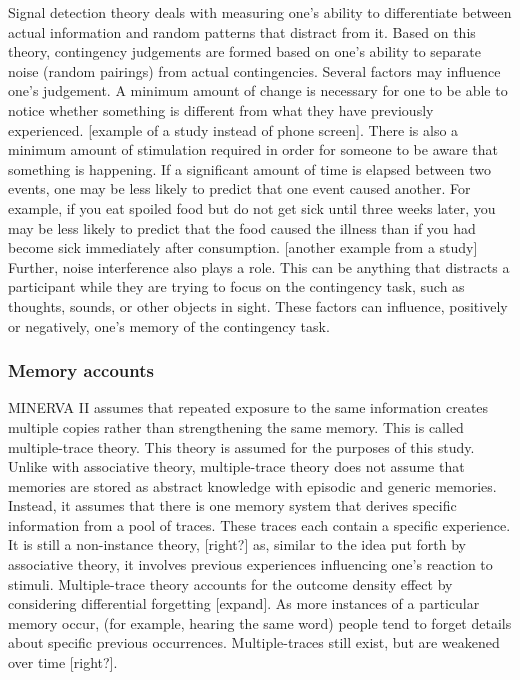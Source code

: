 \documentclass[
  english,
  man,floatsintext]{apa6}
\begin{document}
Signal detection theory deals with measuring one's ability to differentiate between actual information and random patterns that distract from it. Based on this theory, contingency judgements are formed based on one's ability to separate noise (random pairings) from actual contingencies. Several factors may influence one's judgement. A minimum amount of change is necessary for one to be able to notice whether something is different from what they have previously experienced. {[}example of a study instead of phone screen{]}. There is also a minimum amount of stimulation required in order for someone to be aware that something is happening. If a significant amount of time is elapsed between two events, one may be less likely to predict that one event caused another. For example, if you eat spoiled food but do not get sick until three weeks later, you may be less likely to predict that the food caused the illness than if you had become sick immediately after consumption. {[}another example from a study{]} Further, noise interference also plays a role. This can be anything that distracts a participant while they are trying to focus on the contingency task, such as thoughts, sounds, or other objects in sight. These factors can influence, positively or negatively, one's memory of the contingency task.

\hypertarget{memory-accounts}{%
\subsubsection{Memory accounts}\label{memory-accounts}}

MINERVA II assumes that repeated exposure to the same information creates multiple copies rather than strengthening the same memory. This is called multiple-trace theory. This theory is assumed for the purposes of this study. Unlike with associative theory, multiple-trace theory does not assume that memories are stored as abstract knowledge with episodic and generic memories. Instead, it assumes that there is one memory system that derives specific information from a pool of traces. These traces each contain a specific experience. It is still a non-instance theory, {[}right?{]} as, similar to the idea put forth by associative theory, it involves previous experiences influencing one's reaction to stimuli. Multiple-trace theory accounts for the outcome density effect by considering differential forgetting {[}expand{]}. As more instances of a particular memory occur, (for example, hearing the same word) people tend to forget details about specific previous occurrences. Multiple-traces still exist, but are weakened over time {[}right?{]}.
\end{document}
